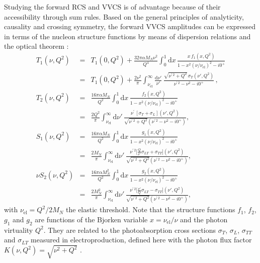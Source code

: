 \documentclass[preprints,review,accept,moreauthors,pdftex]{Definitions/mdpi}
\def\bea{\begin{eqnarray}}
\def\eea{\end{eqnarray}}
\def\eqlab#1{\label{eq:#1}}
\def\al{\alpha}
\def\si{\sigma} \def\Si{{\Sigma}}
\def\nn{\nonumber}
\def\dd{\mathrm{d}}
\begin{document}
Studying the forward RCS and VVCS is of advantage because of their accessibility through sum rules. 
Based on the general principles of analyticity, causality and crossing symmetry, the forward VVCS amplitudes can be expressed in terms of the nucleon structure functions by means of dispersion relations and the optical theorem \cite{Drechsel:2002ar}:
\begin{subequations}
\eqlab{genDRs}
\bea 
T_1 ( \nu, Q^2) &=&T_1(0,Q^2) + \frac{32\pi\al M_N\nu^2}{Q^4} \int_{0}^1 
\!\dd x \,
\frac{x\, f_1 (x, Q^2)}{1 - x^2 (\nu/\nu_{\mathrm{el}})^2 - i 0^+} \eqlab{T1dr}\\ 
&=& T_1(0,Q^2) + \frac{2\nu^2}{\pi } \int_{\nu_{\mathrm{el}}}^\infty\! \frac{\dd \nu'}{\nu'} \, 
\frac{\sqrt{\nu^{\prime\,2}+Q^2}\,\si_T ( \nu', Q^2)}{\nu^{\prime\,2} -\nu^2 - i 0^+}\,,\nn\\
T_2 ( \nu, Q^2) &=& \frac{16\pi\al M_N}{Q^2} \int_{0}^1 
\!\dd x\, 
\frac{f_2 (x, Q^2)}{1 - x^2 (\nu/\nu_{\mathrm{el}})^2  - i 0^+} \eqlab{T2dr}\\
&=&\frac{2Q^2}{\pi} \int_{\nu_{\mathrm{el}}}^\infty\! \dd \nu' \, 
\frac{\nu^{\prime}\,[ \si_T+\si_L] ( \nu', Q^2)}{\sqrt{\nu^{\prime\,2}+Q^2}(\nu^{\prime\,2} -\nu^2- i 0^+)} ,\nn\\
S_1 ( \nu, Q^2) &=&  \frac{16\pi\al M_N}{Q^2} \int_{0}^1 
\!\dd x\, 
\frac{g_1 (x, Q^2)}{1 - x^2 (\nu/\nu_{\mathrm{el}})^2  - i 0^+} \eqlab{S1DR}\\
&=&\frac{2M_N}{\pi} \int_{\nu_{\mathrm{el}}}^\infty \!\dd \nu' \, 
\frac{\nu^{\prime\,2}\big[ \frac{Q}{\nu'}\si_{LT}+\si_{TT}\big] ( \nu', Q^2)}{\sqrt{\nu^{\prime\,2}+Q^2}(\nu^{\prime\,2} -\nu^2- i 0^+)}\nn,\\
\nu S_2 ( \nu, Q^2) &=& \frac{16\pi\al M_N^2}{Q^2} \int_{0}^1 \!\dd x\, 
\frac{g_2 (x, Q^2)}{1 - x^2 (\nu/\nu_{\mathrm{el}})^2  - i 0^+}\eqlab{nuS2}  \\
&=& \frac{2M_N^2}{\pi} \int_{\nu_{\mathrm{el}}}^\infty \!\dd \nu' \, 
\frac{ \nu^{\prime\,2}\big[ \frac{\nu'}{Q}\si_{LT}-\si_{TT}\big] ( \nu', Q^2)}{\sqrt{\nu^{\prime\,2}+Q^2}(\nu^{\prime\,2} -\nu^2- i 0^+)},\nn
\eea 
\end{subequations}
with $\nu_{\mathrm{el}}=Q^2/2M_N$ the elastic threshold. Note that the structure functions $f_1$, $f_2$, $g_1$ and $g_2$ are functions of the Bjorken variable $x=\nu_{\mathrm{el}}/\nu$ and the photon virtuality $Q^2$. They are related to the photoabsorption cross sections $\sigma_T$, $\sigma_L$, $\sigma_{TT}$ and $\sigma_{LT}$ measured in electroproduction, defined here with the photon flux factor $K(\nu,Q
^2)=\sqrt{\nu^2+Q^2}$ \cite{Gilman:1967sn}. 
\end{document}
